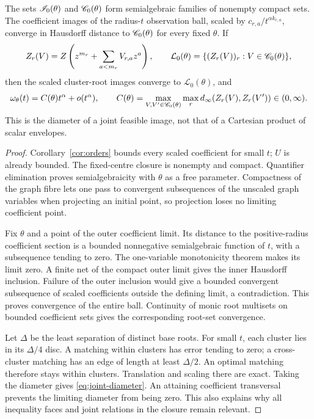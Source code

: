 \begin{theorem}\label{thm:joint}
The sets $\mathscr I_0(\theta)$ and $\mathscr C_0(\theta)$ form semialgebraic families
of nonempty compact sets. The coefficient images of the radius-$t$
observation ball, scaled by $c_{r,a}/t^{\alpha k_{r,a}}$, converge in
Hausdorff distance to $\mathscr C_0(\theta)$ for every fixed $\theta$. If
\[
 Z_r(V)=Z\left(z^{m_r}+\sum_{a<m_r}V_{r,a}z^a\right),\qquad
 \mathcal L_0(\theta)=\{(Z_r(V))_r:V\in\mathscr C_0(\theta)\},
\]
then the scaled cluster-root images converge to $\mathcal L_0(\theta)$,
and
\begin{equation}\label{eq:joint-diameter}
 \omega_\theta(t)=C(\theta)t^\alpha+o(t^\alpha),\qquad
 C(\theta)=\max_{V,V'\in\mathscr C_0(\theta)}\max_r
 d_\infty(Z_r(V),Z_r(V'))\in(0,\infty).
\end{equation}
This is the diameter of a joint feasible image, not that of a Cartesian
product of scalar envelopes.
\end{theorem}
\begin{proof}
Corollary~\ref{cor:orders} bounds every scaled coefficient for small $t$;
$U$ is already bounded. The fixed-centre closure is nonempty and compact.
Quantifier elimination proves semialgebraicity with $\theta$ as a free
parameter. Compactness of the graph fibre lets one pass to convergent
subsequences of the unscaled graph variables when projecting an initial
point, so projection loses no limiting coefficient point.

Fix $\theta$ and a point of the outer coefficient limit. Its distance
to the positive-radius coefficient section is a bounded nonnegative
semialgebraic function of $t$, with a subsequence tending to zero. The
one-variable monotonicity theorem makes its limit zero. A finite net of
the compact outer limit gives the inner Hausdorff inclusion. Failure of
the outer inclusion would give a bounded convergent subsequence of scaled
coefficients outside the defining limit, a contradiction. This proves
convergence of the entire ball. Continuity of monic root multisets on
bounded coefficient sets gives the corresponding root-set convergence.

Let $\Delta$ be the least separation of distinct base roots. For small
$t$, each cluster lies in its $\Delta/4$ disc. A matching within clusters
has error tending to zero; a cross-cluster matching has an edge of length
at least $\Delta/2$. An optimal matching therefore stays within clusters.
Translation and scaling there are exact. Taking the diameter gives
\eqref{eq:joint-diameter}. An attaining coefficient transversal prevents
the limiting diameter from being zero. This also explains why all
inequality faces and joint relations in the closure remain relevant.
\end{proof}

